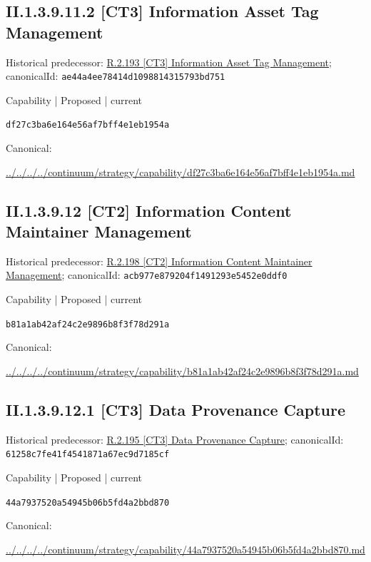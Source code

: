 \documentclass[10pt,a4paper]{article}
\begin{document}
\subsection*{II.1.3.9.11.2 [CT3] Information Asset Tag Management}
Historical predecessor: \hyperref[element-ae44a4ee78414d1098814315793bd751]{R.2.193 [CT3] Information Asset Tag Management}; canonicalId: \texttt{ae44a4ee78414d1098814315793bd751}\par
\label{element-df27c3ba6e164e56af7bff4e1eb1954a}
{\small Capability | Proposed | current}\par
\texttt{df27c3ba6e164e56af7bff4e1eb1954a}\par
Canonical: \par
{\footnotesize\url{../../../../continuum/strategy/capability/df27c3ba6e164e56af7bff4e1eb1954a.md}}\par
\subsection*{II.1.3.9.12 [CT2] Information Content Maintainer Management}
Historical predecessor: \hyperref[element-acb977e879204f1491293e5452e0ddf0]{R.2.198 [CT2] Information Content Maintainer Management}; canonicalId: \texttt{acb977e879204f1491293e5452e0ddf0}\par
\label{element-b81a1ab42af24c2e9896b8f3f78d291a}
{\small Capability | Proposed | current}\par
\texttt{b81a1ab42af24c2e9896b8f3f78d291a}\par
Canonical: \par
{\footnotesize\url{../../../../continuum/strategy/capability/b81a1ab42af24c2e9896b8f3f78d291a.md}}\par
\subsection*{II.1.3.9.12.1 [CT3] Data Provenance Capture}
Historical predecessor: \hyperref[element-61258c7fe41f4541871a67ec9d7185cf]{R.2.195 [CT3] Data Provenance Capture}; canonicalId: \texttt{61258c7fe41f4541871a67ec9d7185cf}\par
\label{element-44a7937520a54945b06b5fd4a2bbd870}
{\small Capability | Proposed | current}\par
\texttt{44a7937520a54945b06b5fd4a2bbd870}\par
Canonical: \par
{\footnotesize\url{../../../../continuum/strategy/capability/44a7937520a54945b06b5fd4a2bbd870.md}}\par
\end{document}
